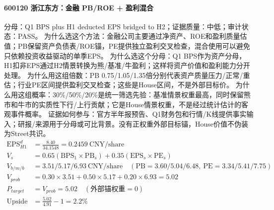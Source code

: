 \paragraph{600120 浙江东方：金融 PB/ROE + 盈利混合}
分母：Q1 BPS plus H1 deducted EPS bridged to H2；证据质量：中低；审计状态：PASS。
为什么选这个方法：金融公司主要通过净资产、ROE和盈利质量估值；PB保留资产负债表/ROE锚，PE提供独立盈利交叉检查，混合使用可以避免只依赖投资收益驱动的单季EPS。
为什么选这个分母：Q1 BPS作为资产分母，H1扣非EPS通过H2情景转换为熊/基准/牛盈利；这样将资产价值和盈利能力分开处理。
为什么用这组倍数：PB 0.75/1.05/1.35倍分别代表资产质量压力/正常/重估；行业PE区间提供盈利交叉检查；这些是House区间，不是外部目标价。
为什么用这组概率：30\%/50\%/20\%是统一筛选先验：基准情景权重最高，同时保留熊市和牛市的实质性下行/上行贡献；它是House情景权重，不是经过统计估计的客观事件概率。
证据如何参与：官方半年报预告、Q1财务包和行情/K线提供事实输入；研报/来源用于分母或可比背景。没有正权重外部目标锚，House价值不伪装为Street共识。
\begin{align*}
\mathrm{EPS}_{H1}^d &= \frac{8.40}{34.1548} = 0.2459\ \mathrm{CNY/share}\\
V_s &= 0.65\left(\mathrm{BPS}_1\times \mathrm{PB}_s\right)+0.35\left(\mathrm{EPS}_s\times \mathrm{PE}_s\right)\\
V_{b/m/b} &= 3.51/5.17/6.93\ \mathrm{CNY/share}\quad(\mathrm{PB}=3.60/5.04/6.48,\ \mathrm{PE}=3.34/5.41/7.75)\\
V_{prob} &= 0.30\times 3.51+0.50\times 5.17+0.20\times 6.93=5.02\\
P_{target} &= V_{prob}=5.02\quad(\text{外部锚权重}=0)\\
\mathrm{Upside} &= \frac{5.02}{4.91}-1=2.2\%\\
\end{align*}

